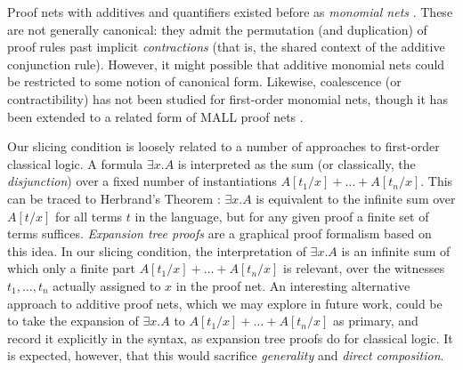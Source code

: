 \documentclass[twoside,a4paper]{article}
\newcommand\+{+}
\renewcommand\*{\times}
\begin{document}
Proof nets with additives and quantifiers existed before as \emph{monomial nets} \cite{Girard-1996}. These are not generally canonical: they admit the permutation (and duplication) of proof rules past implicit \emph{contractions} (that is, the shared context of the additive conjunction rule). However, it might possible that additive monomial nets could be restricted to some notion of canonical form. Likewise, coalescence (or contractibility) has not been studied for first-order monomial nets, though it has been extended to a related form of MALL proof nets \cite{Maieli-2007}.

Our slicing condition is loosely related to a number of approaches to first-order classical logic. A formula $\exists x.A$ is interpreted as the sum (or classically, the \emph{disjunction}) over a fixed number of instantiations $A[t_1/x]\+\dots\+A[t_n/x]$. This can be traced to Herbrand's Theorem \cite{Herbrand-1930}: $\exists x.A$ is equivalent to the infinite sum over $A[t/x]$ for all terms $t$ in the language, but for any given proof a finite set of terms suffices. \emph{Expansion tree proofs} \cite{Miller-1987,Heijltjes-2010} are a graphical proof formalism based on this idea.
%
In our slicing condition, the interpretation of $\exists x.A$ is an infinite sum of which only a finite part $A[t_1/x]\+\dots\+A[t_n/x]$ is relevant, over the witnesses $t_1,\dots,t_n$ actually assigned to $x$ in the proof net. An interesting alternative approach to additive proof nets, which we may explore in future work, could be to take the expansion of $\exists x.A$ to $A[t_1/x]\+\dots\+A[t_n/x]$ as primary, and record it explicitly in the syntax, as expansion tree proofs do for classical logic. It is expected, however, that this would sacrifice \emph{generality} and \emph{direct composition}.
\end{document}
